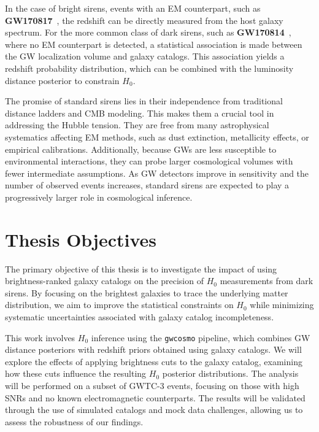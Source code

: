 In the case of bright sirens, events with an \ac{EM} counterpart, such as \textbf{GW170817}~\citep{LIGOScientific:2017adf}, the redshift can be directly measured from the host galaxy spectrum. For the more common class of dark sirens, such as \textbf{GW170814}~\citep{DES:2019ccw}, where no \ac{EM} counterpart is detected, a statistical association is made between the \ac{GW} localization volume and galaxy catalogs. This association yields a redshift probability distribution, which can be combined with the luminosity distance posterior to constrain $H_0$.

The promise of standard sirens lies in their independence from traditional distance ladders and \ac{CMB} modeling. This makes them a crucial tool in addressing the Hubble tension. They are free from many astrophysical systematics affecting \ac{EM} methods, such as dust extinction, metallicity effects, or empirical calibrations. Additionally, because \acp{GW} are less susceptible to environmental interactions, they can probe larger cosmological volumes with fewer intermediate assumptions. As \ac{GW} detectors improve in sensitivity and the number of observed events increases, standard sirens are expected to play a progressively larger role in cosmological inference.

\section{Thesis Objectives}
The primary objective of this thesis is to investigate the impact of using brightness-ranked galaxy catalogs on the precision of $H_0$ measurements from dark sirens. By focusing on the brightest galaxies to trace the underlying matter distribution, we aim to improve the statistical constraints on $H_0$ while minimizing systematic uncertainties associated with galaxy catalog incompleteness.

This work involves $H_0$ inference using the \texttt{gwcosmo} pipeline, which combines \ac{GW} distance posteriors with redshift priors obtained using galaxy catalogs. We will explore the effects of applying brightness cuts to the galaxy catalog, examining how these cuts influence the resulting $H_0$ posterior distributions. The analysis will be performed on a subset of \acf{GWTC}-3 events, focusing on those with high \acp{SNR} and no known electromagnetic counterparts. The results will be validated through the use of simulated catalogs and mock data challenges, allowing us to assess the robustness of our findings.

